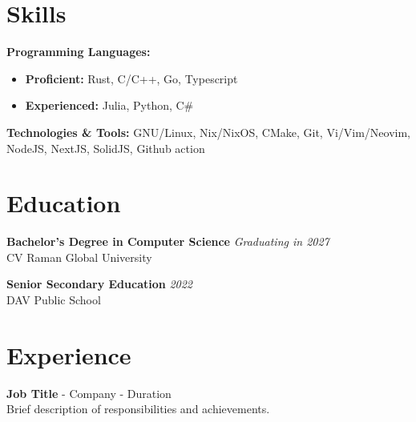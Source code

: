 \section*{Skills}
\textbf{Programming Languages:}
\begin{itemize}[noitemsep, topsep=0pt]
    \item \textbf{Proficient:} Rust, C/C++, Go, Typescript
    \item \textbf{Experienced:} Julia, Python, C\#
\end{itemize}

\noindent\textbf{Technologies \& Tools:} GNU/Linux, Nix/NixOS, CMake, Git, Vi/Vim/Neovim, NodeJS, NextJS, SolidJS, Github action \\

\section*{Education}
\noindent\textbf{Bachelor's Degree in Computer Science} \hfill \textit{Graduating in 2027}\\
\noindent CV Raman Global University

\noindent\textbf{Senior Secondary Education} \hfill \textit{2022}\\
\noindent DAV Public School

\section*{Experience}
\textbf{Job Title} - Company - Duration \\
Brief description of responsibilities and achievements.


